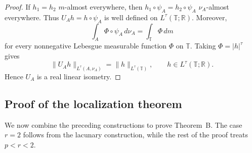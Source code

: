 \documentclass[10pt,a4paper]{amsart}
\newcommand{\T}{\mathbb{T}}
\newcommand{\R}{\mathbb{R}}
\begin{document}
\begin{proof}
If \(h_1=h_2\) \(m\)-almost everywhere, then
\(h_1\circ\psi_A=h_2\circ\psi_A\) \(\nu_A\)-almost everywhere.
Thus \(U_Ah=h\circ\psi_A\) is well defined on
\(L^\tau(\T;\R)\). Moreover,
\[
        \int_A \Phi\circ\psi_A\,d\nu_A
        =
        \int_\T \Phi\,dm
\]
for every nonnegative Lebesgue measurable function \(\Phi\) on
\(\T\). Taking \(\Phi=|h|^\tau\) gives
\[
        \|U_Ah\|_{L^\tau(A,\nu_A)}
        =
        \|h\|_{L^\tau(\T)},
        \qquad
        h\in L^\tau(\T;\R).
\]
Hence \(U_A\) is a real linear isometry.
\end{proof}
\subsection{Proof of the localization theorem}
\label{subsec:local-Lr}

We now combine the preceding constructions to prove Theorem~B.  The case \(r=2\) follows
from the lacunary construction, while the rest of the proof treats
\(p<r<2\).
\end{document}
